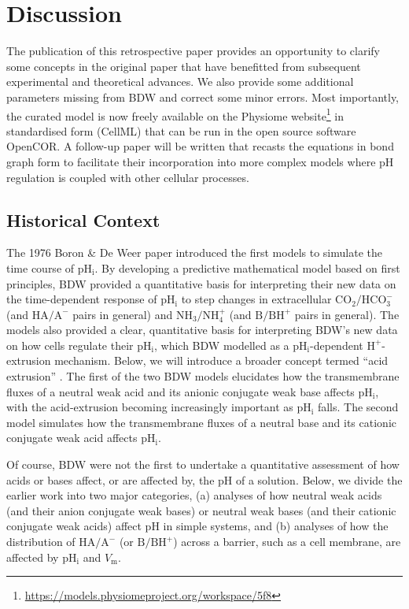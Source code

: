 \documentclass[fleqn,10pt]{physiome}
\begin{document}
\section{Discussion}

The publication of this retrospective paper provides an opportunity to clarify some concepts in the original paper that have benefitted from subsequent experimental and theoretical advances. We also provide some additional parameters missing from BDW and correct some minor errors. Most importantly, the curated model is now freely available on the Physiome  website\footnote{\url{https://models.physiomeproject.org/workspace/5f8}} in standardised form (CellML) that can be run in the open source software OpenCOR. A follow-up paper will be written that recasts the equations in bond graph form to facilitate their incorporation into more complex models where $\mathrm{pH}$ regulation is coupled with other cellular processes.

\subsection{Historical Context}

The 1976 Boron \& De Weer paper introduced the first models to simulate the time course of $\mathrm{pH_i}$. By developing a predictive mathematical model based on first principles, BDW provided a quantitative basis for interpreting their new data on the time-dependent response of $\mathrm{pH_i}$ to step changes in extracellular $\mathrm{CO_2}/\mathrm{HCO_3^-}$ (and $\mathrm{HA}/\mathrm{A^-}$ pairs in general) and $\mathrm{NH_3}/\mathrm{NH_4^+}$ (and $\mathrm{B/BH^+}$ pairs in general). The models also provided a clear, quantitative basis for interpreting BDW's new data on how cells regulate their $\mathrm{pH_i}$, which BDW modelled as a $\mathrm{pH_i}$-dependent $\mathrm{H^+}$-extrusion mechanism. Below, we will introduce a broader concept termed ``acid extrusion'' \citep{boron1977intracellular}. The first of the two BDW models elucidates how the transmembrane fluxes of a neutral weak acid and its anionic conjugate weak base affects $\mathrm{pH_i}$, with the acid-extrusion becoming increasingly important as $\mathrm{pH_i}$ falls. The second model simulates how the transmembrane fluxes of a neutral base and its cationic conjugate weak acid affects $\mathrm{pH_i}$.

Of course, BDW were not the first to undertake a quantitative assessment of how acids or bases affect, or are affected by, the $\mathrm{pH}$ of a solution. Below, we divide the earlier work into two major categories, (a) analyses of how neutral weak acids (and their anion conjugate weak bases) or neutral weak bases (and their cationic conjugate weak acids) affect $\mathrm{pH}$ in simple systems, and (b) analyses of how the distribution of $\mathrm{HA}/\mathrm{A^-}$ (or $\mathrm{B}/\mathrm{BH^+}$) across a barrier, such as a cell membrane, are affected by $\mathrm{pH_i}$ and $V_\mathrm{m}$.
\end{document}
